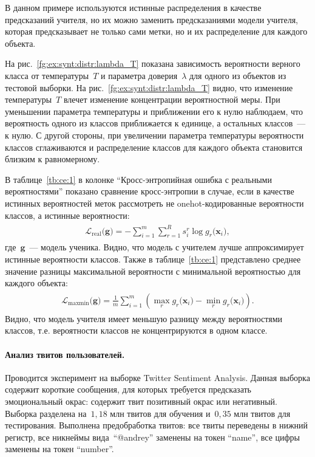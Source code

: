 В данном примере используются истинные распределения в качестве предсказаний учителя, но их можно заменить предсказаниями модели учителя, которая предсказывает не только сами метки, но и их распределение для каждого объекта.

На рис.~\ref{fg:ex:synt:distr:lambda_T} показана зависимость вероятности верного класса от температуры~$T$ и параметра доверия~$\lambda$ для одного из объектов из тестовой выборки. На рис.~\ref{fg:ex:synt:distr:lambda_T} видно, что изменение температуры~$T$ влечет изменение концентрации вероятностной меры. При уменьшении параметра температуры и приближении его к нулю наблюдаем, что вероятность одного из классов приближается к единице, а остальных классов~--- к нулю. С другой стороны, при увеличении параметра температуры вероятности классов сглаживаются и распределение классов для каждого объекта становится близким к равномерному.

В таблице~\ref{tb:ce:1} в колонке ``Кросс-энтропийная ошибка с реальными вероятностями'' показано сравнение кросс-энтропии в случае, если в качестве истинных вероятностей меток рассмотреть не onehot-кодированные вероятности классов, а истинные вероятности:
\begin{gather}
\label{eq:ce:1}
\begin{aligned}
\mathcal{L}_{\text{real}}\bigr(\mathbf{g}\bigr) = - \sum_{i=1}^{m}\sum_{r=1}^{R}s_{i}^{r}\log g_r\bigr(\mathbf{x}_i\bigr),
\end{aligned}
\end{gather}
где~$\mathbf{g}$~--- модель ученика. Видно, что модель с учителем лучше аппроксимирует истинные вероятности классов. Также в таблице~\ref{tb:ce:1}
представлено среднее значение разницы максимальной вероятности с минимальной вероятностью для каждого объекта:
\begin{gather}
\label{eq:ce:2}
\begin{aligned}
\mathcal{L}_{\text{maxmin}}\bigr(\mathbf{g}\bigr) = \frac{1}{m}\sum_{i=1}^{m}\left(\max_{r}g_r\bigr(\mathbf{x}_i\bigr) -  \min_{r}g_r\bigr(\mathbf{x}_i\bigr)\right).
\end{aligned}
\end{gather}
Видно, что модель учителя имеет меньшую разницу между вероятностями классов, т.е. вероятности классов не концентрируются в одном классе.


\paragraph{Анализ твитов пользователей.}Проводится эксперимент на выборке Twitter Sentiment Analysis. Данная выборка содержит короткие сообщения, для которых требуется предсказать эмоциональный окрас: содержит твит позитивный окрас или негативный. Выборка разделена на~$1{,}18$ млн твитов для обучения и~$0{,}35$ млн твитов для тестирования. Выполнена предобработка твитов: все твиты переведены в нижний регистр, все никнеймы вида~``@andrey'' заменены на токен ``name'', все цифры заменены на токен ``number''.

